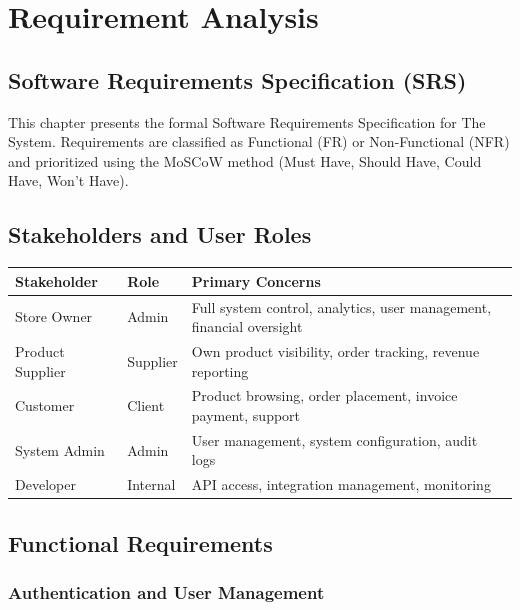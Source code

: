 \documentclass[12pt,a4paper]{report}
\begin{document}
\chapter{Requirement Analysis}

\section{Software Requirements Specification (SRS)}

This chapter presents the formal Software Requirements Specification for The System. Requirements are classified as Functional (FR) or Non-Functional (NFR) and prioritized using the MoSCoW method (Must Have, Should Have, Could Have, Won't Have).

\section{Stakeholders and User Roles}

\begin{center}
\begin{tabularx}{\textwidth}{llX}
  \toprule
  \textbf{Stakeholder} & \textbf{Role} & \textbf{Primary Concerns} \\
  \midrule
  Store Owner   & Admin    & Full system control, analytics, user management, financial oversight \\
  Product Supplier & Supplier & Own product visibility, order tracking, revenue reporting \\
  Customer      & Client   & Product browsing, order placement, invoice payment, support \\
  System Admin  & Admin    & User management, system configuration, audit logs \\
  Developer     & Internal & API access, integration management, monitoring \\
  \bottomrule
\end{tabularx}
\end{center}

\section{Functional Requirements}

\subsection{Authentication and User Management}
\end{document}

